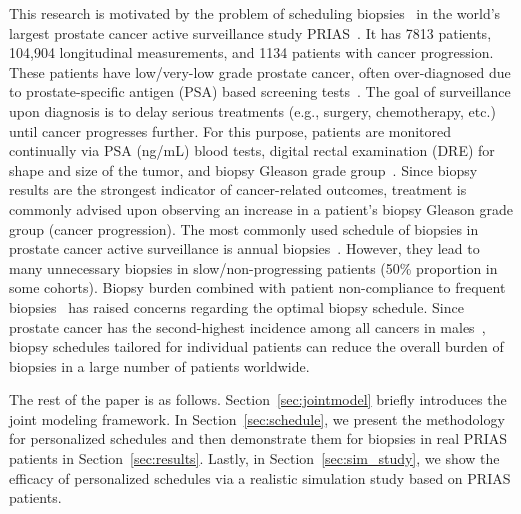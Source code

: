 This research is motivated by the problem of scheduling biopsies~\citep{nieboer2018active} in the world's largest prostate cancer active surveillance study PRIAS~\citep{bokhorst2015compliance}. It has 7813 patients, 104,904 longitudinal measurements, and 1134 patients with cancer progression. These patients have low/very-low grade prostate cancer, often over-diagnosed due to prostate-specific antigen (PSA) based screening tests~\citep{crawford2003epidemiology}. The goal of surveillance upon diagnosis is to delay serious treatments (e.g., surgery, chemotherapy, etc.) until cancer progresses further. For this purpose, patients are monitored continually via PSA (ng/mL) blood tests, digital rectal examination (DRE) for shape and size of the tumor, and biopsy Gleason grade group~\citep{epsteinGG2014}. Since biopsy results are the strongest indicator of cancer-related outcomes, treatment is commonly advised upon observing an increase in a patient's biopsy Gleason grade group (cancer progression). The most commonly used schedule of biopsies in prostate cancer active surveillance is annual biopsies~\citep{loeb2014heterogeneity}. However, they lead to many unnecessary biopsies in slow/non-progressing patients (50\% proportion in some cohorts). Biopsy burden combined with patient non-compliance to frequent biopsies~\citep{bokhorst2015compliance} has raised concerns regarding the optimal biopsy schedule. Since prostate cancer has the second-highest incidence among all cancers in males~\citep{GlobalCancerStats2012}, biopsy schedules tailored for individual patients can reduce the overall burden of biopsies in a large number of patients worldwide.

The rest of the paper is as follows. Section~\ref{sec:jointmodel} briefly introduces the joint modeling framework. In Section~\ref{sec:schedule}, we present the methodology for personalized schedules and then demonstrate them for biopsies in real PRIAS patients in Section~\ref{sec:results}. Lastly, in Section~\ref{sec:sim_study}, we show the efficacy of personalized schedules via a realistic simulation study based on PRIAS patients.
